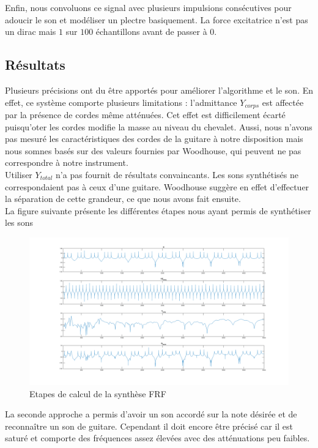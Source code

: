 Enfin, nous convoluons ce signal avec plusieurs impulsions consécutives pour
adoucir le son et modéliser un plectre basiquement. La force excitatrice n'est
pas un dirac mais $1$ sur $100$ échantillons avant de passer à 0.

\subsection{Résultats}
%
Plusieurs précisions ont du être apportés pour améliorer l'algorithme et le
son. En effet, ce système comporte plusieurs limitations : l'admittance
$Y_{corps}$ est affectée par la présence de cordes même atténuées. Cet effet
est difficilement écarté puisqu'oter les cordes modifie la masse au niveau du
chevalet. Aussi, nous n'avons pas mesuré les caractéristiques des cordes de la
guitare à notre disposition mais nous somnes basés sur des valeurs fournies par
Woodhouse, qui peuvent ne pas correspondre à notre instrument.  \\

Utiliser $Y_{total}$ n'a pas fournit de résultats convaincants. Les sons
synthétisés ne correspondaient pas à ceux d'une guitare. Woodhouse suggère en
effet d'effectuer la séparation de cette grandeur, ce que nous avons fait
ensuite.\\

La figure suivante présente les différentes étapes nous ayant permis de
synthétiser les sons

\begin{figure}[h]
\centering
\includegraphics[width=\linewidth]{figures/frf_rapport_intermediaire.png}
\caption{Etapes de calcul de la synthèse FRF}
\label{fig:FRF1}
\end{figure}

La seconde approche a permis d'avoir un son accordé sur la note désirée et de
reconnaître un son de guitare. Cependant il doit encore être précisé car il est
saturé et comporte des fréquences assez élevées avec des atténuations peu
faibles.


